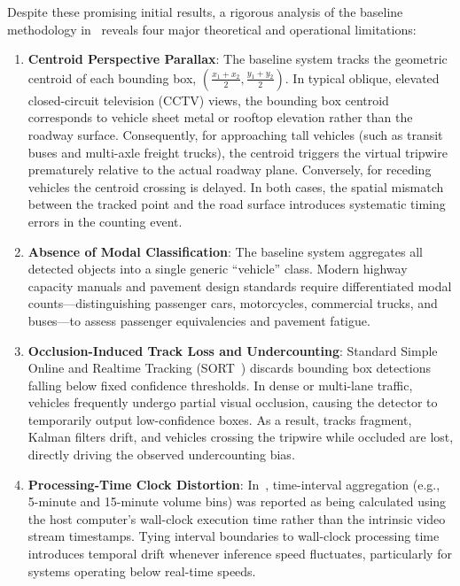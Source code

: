 Despite these promising initial results, a rigorous analysis of the baseline methodology in~\cite{majumder2023automated} reveals four major theoretical and operational limitations:
\begin{enumerate}
    \item \textbf{Centroid Perspective Parallax}: The baseline system tracks the geometric centroid of each bounding box, $(\frac{x_1+x_2}{2}, \frac{y_1+y_2}{2})$. In typical oblique, elevated closed-circuit television (CCTV) views, the bounding box centroid corresponds to vehicle sheet metal or rooftop elevation rather than the roadway surface. Consequently, for approaching tall vehicles (such as transit buses and multi-axle freight trucks), the centroid triggers the virtual tripwire prematurely relative to the actual roadway plane. Conversely, for receding vehicles the centroid crossing is delayed. In both cases, the spatial mismatch between the tracked point and the road surface introduces systematic timing errors in the counting event.
    \item \textbf{Absence of Modal Classification}: The baseline system aggregates all detected objects into a single generic ``vehicle'' class. Modern highway capacity manuals and pavement design standards require differentiated modal counts---distinguishing passenger cars, motorcycles, commercial trucks, and buses---to assess passenger equivalencies and pavement fatigue.
    \item \textbf{Occlusion-Induced Track Loss and Undercounting}: Standard Simple Online and Realtime Tracking (SORT~\cite{bewley2016sort}) discards bounding box detections falling below fixed confidence thresholds. In dense or multi-lane traffic, vehicles frequently undergo partial visual occlusion, causing the detector to temporarily output low-confidence boxes. As a result, tracks fragment, Kalman filters drift, and vehicles crossing the tripwire while occluded are lost, directly driving the observed undercounting bias.
    \item \textbf{Processing-Time Clock Distortion}: In~\cite{majumder2023automated}, time-interval aggregation (e.g., 5-minute and 15-minute volume bins) was reported as being calculated using the host computer's wall-clock execution time rather than the intrinsic video stream timestamps. Tying interval boundaries to wall-clock processing time introduces temporal drift whenever inference speed fluctuates, particularly for systems operating below real-time speeds.
\end{enumerate}

